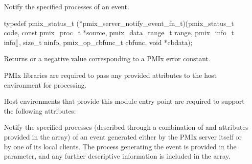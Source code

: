 \summary

Notify the specified processes of an event.

\format

\cspecificstart
\begin{codepar}
typedef pmix_status_t (*pmix_server_notify_event_fn_t)(pmix_status_t code,
                             const pmix_proc_t *source,
                             pmix_data_range_t range,
                             pmix_info_t info[],
                             size_t ninfo,
                             pmix_op_cbfunc_t cbfunc,
                             void *cbdata);
\end{codepar}
\cspecificend

\begin{arglist}
\end{arglist}

Returns  or a negative value corresponding to a \ac{PMIx} error constant.

\reqattrstart
\ac{PMIx} libraries are required to pass any provided attributes to the host environment for processing.

Host environments that provide this module entry point are required to support the following attributes:


\reqattrend

\descr

Notify the specified processes (described through a combination of  and attributes provided in the  array) of an event generated either by the \ac{PMIx} server itself or by one of its local clients.
The process generating the event is provided in the  parameter, and any further descriptive information is
included in the  array.

